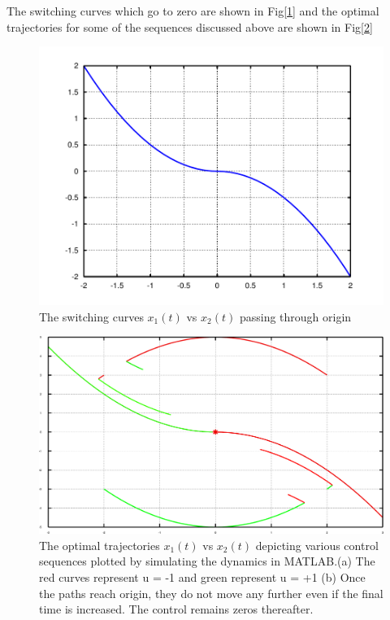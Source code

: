 \begin{enumerate}
The switching curves which go to zero are shown in Fig[\ref{fig5}] and the optimal trajectories for some of the sequences
discussed above are shown in Fig[\ref{fig6}]
  \begin{figure}[h!]
    \includegraphics[width=\linewidth]{pic5.pdf}
    \caption{The switching curves $x_1(t)$ vs $x_2(t)$ passing through origin}
    \label{fig5} 
  \end{figure}
  \begin{figure}[h!]
    \includegraphics[width=\linewidth]{pic6.pdf}
    \caption{The optimal trajectories  $x_1(t)$ vs $x_2(t)$ depicting various control sequences plotted by simulating the
dynamics in MATLAB.(a) The red curves represent u = -1 and green represent u = +1 (b) Once the paths reach origin, they do not
move any further even if the final time is increased. The control remains zeros thereafter.}
    \label{fig6} 
  \end{figure}


\end{enumerate}
